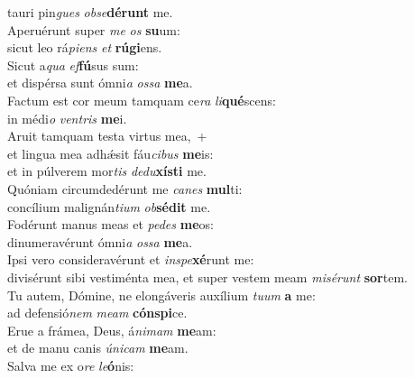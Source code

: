 \evenverse tauri pin\textit{gues} \textit{ob}\textit{se}\textbf{dé}\textbf{runt} me.\\
\oddverse Aperuérunt super \textit{me} \textit{os} \textbf{su}um:~\*\\
\oddverse sicut leo rá\textit{pi}\textit{ens} \textit{et} \textbf{rú}\textbf{gi}ens.\\
\evenverse Sicut a\textit{qua} \textit{ef}\textbf{fú}sus sum:~\*\\
\evenverse et dispérsa sunt ómni\textit{a} \textit{os}\textit{sa} \textbf{me}a.\\
\oddverse Factum est cor meum tamquam ce\textit{ra} \textit{li}\textbf{qué}scens:~\*\\
\oddverse in médi\textit{o} \textit{ven}\textit{tris} \textbf{me}i.\\
\evenverse Aruit tamquam testa virtus mea,~+\\
\evenverse  et lingua mea adhǽsit fáu\textit{ci}\textit{bus} \textbf{me}is:~\*\\
\evenverse et in púlverem mor\textit{tis} \textit{de}\textit{du}\textbf{xí}\textbf{sti} me.\\
\oddverse Quóniam circumdedérunt me \textit{ca}\textit{nes} \textbf{mul}ti:~\*\\
\oddverse concílium malignán\textit{ti}\textit{um} \textit{ob}\textbf{sé}\textbf{dit} me.\\
\evenverse Fodérunt manus meas et \textit{pe}\textit{des} \textbf{me}os:~\*\\
\evenverse dinumeravérunt ómni\textit{a} \textit{os}\textit{sa} \textbf{me}a.\\
\oddverse Ipsi vero consideravérunt et \textit{in}\textit{spe}\textbf{xé}runt me:~\*\\
\oddverse divisérunt sibi vestiménta mea, et super vestem meam \textit{mi}\textit{sé}\textit{runt} \textbf{sor}tem.\\
\evenverse Tu autem, Dómine, ne elongáveris auxílium \textit{tu}\textit{um} \textbf{a} me:~\*\\
\evenverse ad defensió\textit{nem} \textit{me}\textit{am} \textbf{cón}\textbf{spi}ce.\\
\oddverse Erue a frámea, Deus, á\textit{ni}\textit{mam} \textbf{me}am:~\*\\
\oddverse et de manu canis \textit{ú}\textit{ni}\textit{cam} \textbf{me}am.\\
\evenverse Salva me ex o\textit{re} \textit{le}\textbf{ó}nis:~\*\\
